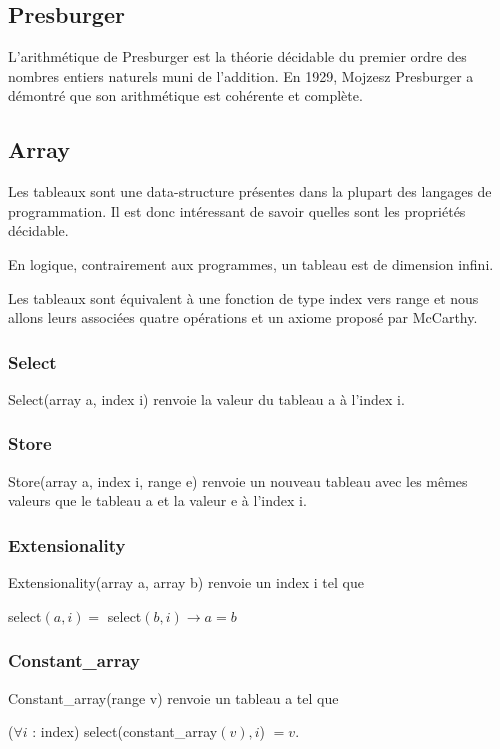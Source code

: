 \documentclass[9pt]{book}
\begin{document}
 		\subsection{Presburger}
 			L'arithm\'etique de Presburger est la th\'eorie  d\'ecidable du premier ordre des nombres entiers naturels muni de l'addition. En 1929, Mojzesz Presburger a d\'emontr\'e que son arithm\'etique est coh\'erente et compl\`ete.
 		\subsection{Array}
 			Les tableaux sont une data-structure pr\'esentes dans la plupart des langages de programmation. Il est donc int\'eressant de savoir quelles sont les propri\'et\'es d\'ecidable. \par
 			
 			En logique, contrairement aux programmes, un tableau est de dimension infini. \par 
 			Les tableaux sont \'equivalent \`a une fonction de type index vers range et nous allons leurs associ\'ees quatre op\'erations et un axiome propos\'e par McCarthy. \par
 			\subsubsection{Select}
 			Select(array a, index i) renvoie la valeur du tableau a \`a l'index i.\par
			 \subsubsection{Store}
			Store(array a, index i, range e) renvoie un nouveau tableau avec les m\^emes valeurs que le tableau a et la valeur e \`a l'index i.
			   
 			\subsubsection{Extensionality}
 			Extensionality(array a, array b) renvoie un index i tel que    
\par select$(a,i) = $ select$(b,i)\rightarrow a = b $ 
 			
 			\subsubsection{Constant\_array}
 			Constant\_array(range v) renvoie un tableau a tel que \par
 			($\forall i$ : index) select(constant\_array$(v),i$) $= v$.
 			
\end{document}
